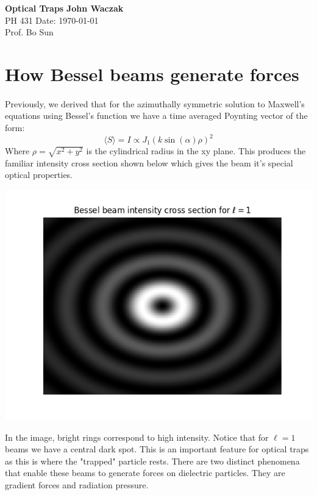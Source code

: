 \documentclass[a4paper, 11pt]{article}
\begin{document}
\noindent
\large\textbf{Optical Traps} \hfill \textbf{John Waczak} \\
\normalsize PH 431 \hfill  Date: \today \\
Prof. Bo Sun  \\


\section*{How Bessel beams generate forces} 
\paragraph{}
Previously, we derived that for the azimuthally symmetric solution to Maxwell's equations using Bessel's function we have a time averaged Poynting vector of the form: 
	\begin{equation}
		\langle S \rangle = I \propto J_1(k\sin(\alpha)\rho)^2
	\end{equation}
Where $\rho = \sqrt{x^2+y^2}$ is the cylindrical radius in the xy plane. This produces the familiar intensity cross section shown below which gives the beam it's special optical properties. 
	\begin{center}
		\includegraphics[scale=0.4]{intensityProfile}
	\end{center}
In the image, bright rings correspond to high intensity. Notice that for $\ell = 1$ beams we have a central dark spot. This is an important feature for optical traps as this is where the "trapped" particle rests. There are two distinct phenomena that enable these beams to generate forces on dielectric particles. They are gradient forces and radiation pressure. 
\end{document}
